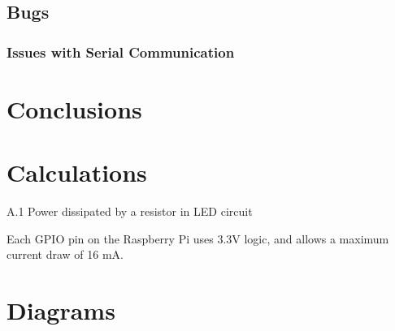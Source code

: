 \documentclass[12pt]{report}
\let\Oldsection\section
\renewcommand{\section}{\FloatBarrier\Oldsection}
\let\Oldsubsection\subsection
\renewcommand{\subsection}{\FloatBarrier\Oldsubsection}
\begin{document}

\section{Bugs} \label{bugs}

\subsection{Issues with Serial Communication} \label{issues-with-serial-communcation}


\chapter{Conclusions} \label{conclusions}


\printbibliography


\appendix


\chapter{Calculations} \label{appendix:calculations}

A.1 Power dissipated by a resistor in LED circuit

Each GPIO pin on the Raspberry Pi uses 3.3V logic, and allows a maximum current draw of 16 mA. 


\chapter{Diagrams} \label{appendix:diagrams}
\end{document}
